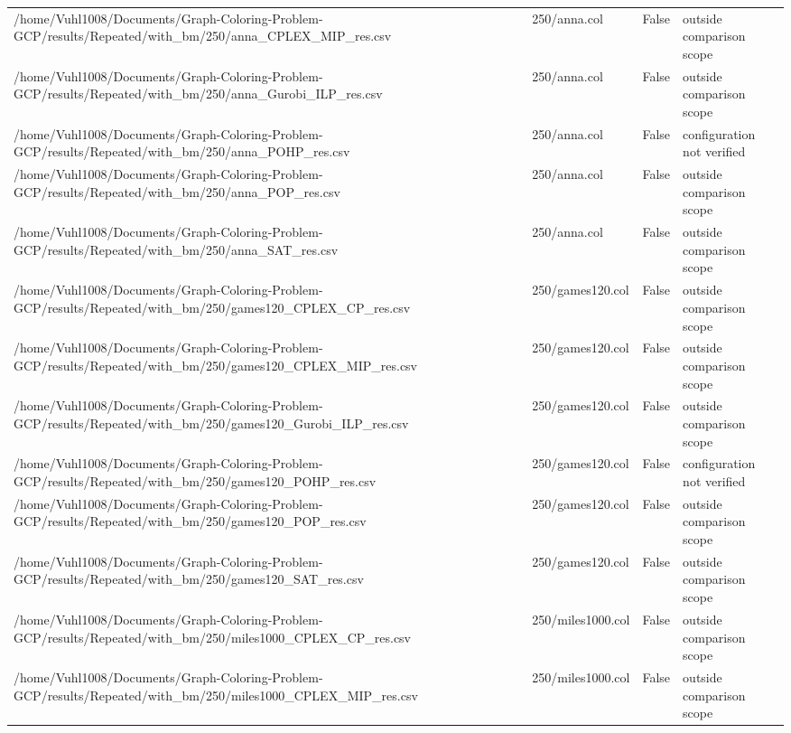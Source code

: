\begin{table}[htbp]
\begin{tabular}{llll}
/home/Vuhl1008/Documents/Graph-Coloring-Problem-GCP/results/Repeated/with\_bm/250/anna\_CPLEX\_MIP\_res.csv & 250/anna.col & False & outside comparison scope \\
/home/Vuhl1008/Documents/Graph-Coloring-Problem-GCP/results/Repeated/with\_bm/250/anna\_Gurobi\_ILP\_res.csv & 250/anna.col & False & outside comparison scope \\
/home/Vuhl1008/Documents/Graph-Coloring-Problem-GCP/results/Repeated/with\_bm/250/anna\_POHP\_res.csv & 250/anna.col & False & configuration not verified \\
/home/Vuhl1008/Documents/Graph-Coloring-Problem-GCP/results/Repeated/with\_bm/250/anna\_POP\_res.csv & 250/anna.col & False & outside comparison scope \\
/home/Vuhl1008/Documents/Graph-Coloring-Problem-GCP/results/Repeated/with\_bm/250/anna\_SAT\_res.csv & 250/anna.col & False & outside comparison scope \\
/home/Vuhl1008/Documents/Graph-Coloring-Problem-GCP/results/Repeated/with\_bm/250/games120\_CPLEX\_CP\_res.csv & 250/games120.col & False & outside comparison scope \\
/home/Vuhl1008/Documents/Graph-Coloring-Problem-GCP/results/Repeated/with\_bm/250/games120\_CPLEX\_MIP\_res.csv & 250/games120.col & False & outside comparison scope \\
/home/Vuhl1008/Documents/Graph-Coloring-Problem-GCP/results/Repeated/with\_bm/250/games120\_Gurobi\_ILP\_res.csv & 250/games120.col & False & outside comparison scope \\
/home/Vuhl1008/Documents/Graph-Coloring-Problem-GCP/results/Repeated/with\_bm/250/games120\_POHP\_res.csv & 250/games120.col & False & configuration not verified \\
/home/Vuhl1008/Documents/Graph-Coloring-Problem-GCP/results/Repeated/with\_bm/250/games120\_POP\_res.csv & 250/games120.col & False & outside comparison scope \\
/home/Vuhl1008/Documents/Graph-Coloring-Problem-GCP/results/Repeated/with\_bm/250/games120\_SAT\_res.csv & 250/games120.col & False & outside comparison scope \\
/home/Vuhl1008/Documents/Graph-Coloring-Problem-GCP/results/Repeated/with\_bm/250/miles1000\_CPLEX\_CP\_res.csv & 250/miles1000.col & False & outside comparison scope \\
/home/Vuhl1008/Documents/Graph-Coloring-Problem-GCP/results/Repeated/with\_bm/250/miles1000\_CPLEX\_MIP\_res.csv & 250/miles1000.col & False & outside comparison scope \\

\end{tabular}
\end{table}
